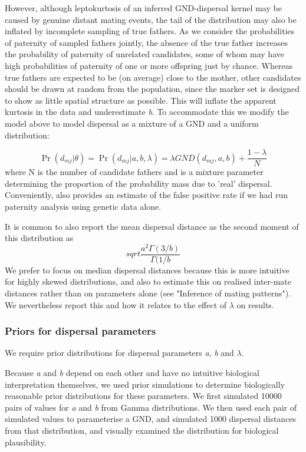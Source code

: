\documentclass[10pt, a4paper, twocolumn]{article} %
\begin{document}
However, although leptokurtosis of an inferred GND-dispersal kernel may be caused by genuine distant mating events, the tail of the distribution may also be inflated by incomplete sampling of true fathers. As we consider the probabilities of paternity of sampled fathers jointly, the absence of the true father increases the probability of paternity of unrelated candidates, some of whom may have high probabilities of paternity of one or more offspring just by chance. Whereas true fathers are expected to be (on average) close to the mother, other candidates should be drawn at random from the population, since the marker set is designed to show as little spatial structure as possible. This will inflate the apparent kurtosis in the data and underestimate \textit{b}. To accommodate this we modify the model above to model dispersal as a mixture of a GND and a uniform distribution:

\begin{equation}\label{eqn:mixture_model}
\Pr(d_{mj} | \theta) = \Pr(d_{mj} | a,b,\lambda) = \lambda GND(d_{mj},a,b) + \frac{1-\lambda}{N}
\end{equation}
where N is the number of candidate fathers and  is a mixture parameter determining the proportion of the probability mass due to ’real’ dispersal. Conveniently, also provides an estimate of the false positive rate if we had run paternity analysis using genetic data alone.

It is common to also report the mean dispersal distance as the second moment of this distribution as
\begin{equation}
\label{eqn:sd_GND}    
sqrt{ \frac{a^2 \Gamma(3/b)}{\Gamma(1/b} }
\end{equation}
We prefer to focus on median dispersal distances because this is more intuitive for highly skewed distributions, and also to estimate this on realised inter-mate distances rather than on parameters alone (see "Inference of mating patterns"). We nevertheless report this and how it relates to the effect of $\lambda$ on results.

\subsubsection{Priors for dispersal parameters}

We require prior distributions for dispersal parameters \textit{a}, \textit{b} and $\lambda$.

Because \textit{a} and \textit{b} depend on each other and have no intuitive biological interpretation themselves, we used prior simulations to determine biologically reasonable prior distributions for these parameters. We first simulated 10000 pairs of values for \textit{a} and \textit{b} from Gamma distributions. We then used each pair of simulated values to parameterise a GND, and simulated 1000 dispersal distances from that distribution, and visually examined the distribution for biological plausibility.
\end{document}
